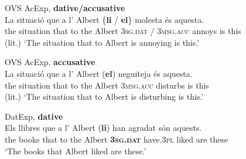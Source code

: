 \documentclass[output=paper,colorlinks,citecolor=brown,modfonts,nonflat]{langsci/langscibook}
\begin{document}
\ea%
 \label{ex:royo:10}
 \ea  OVS AcExp, \textbf{dative/accusative} \label{ex:royo:10a}\\
 \gll  La situació que a l’ Albert \{\textbf{li} / \textbf{el}\} molesta és aquesta.\\
	 the situation that to the Albert \textsc{3sg.dat} / \textsc{3msg.acc} annoys is this\\
 \glt (lit.) ‘The situation that to Albert is annoying is this.’
 
 \ex OVS AcExp, \textbf{accusative}\label{ex:royo:10b}\\
 \gll La  situació  que a  l’ Albert (\textbf{el}) neguiteja és aquesta.\\
  the situation that to the Albert \textsc{3msg.acc} disturbs is this\\
 \glt (lit.) ‘The situation that to Albert is disturbing is this.’
  
 \ex  DatExp, \textbf{dative} \label{ex:royo:10c}\\
 \gll Els llibres que a l’ Albert (\textbf{li}) han agradat són aquests.\\
  the books that to the Albert \textbf{\textsc{3sg.dat}} have.\textsc{3pl} liked are these\\
 \glt ‘The books that Albert liked are these.’
 
\end{document}
